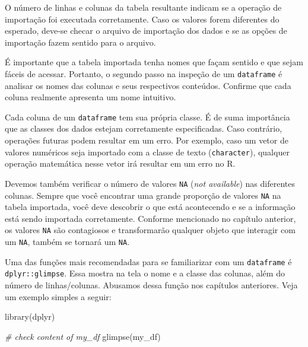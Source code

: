 \documentclass[
  11pt,
]{book}
\newenvironment{Shaded}{\begin{snugshade}}{\end{snugshade}}
\newcommand{\CommentTok}[1]{\textcolor[rgb]{0.37,0.37,0.37}{\textit{#1}}}
\newcommand{\FunctionTok}[1]{\textcolor[rgb]{0,0,0}{#1}}
\newcommand{\NormalTok}[1]{#1}
\providecommand{\tightlist}{%
  \setlength{\itemsep}{0pt}\setlength{\parskip}{0pt}}
\begin{document}
\begin{description}
\tightlist
\item[Número de linhas e colunas]
O número de linhas e colunas da tabela resultante indicam se a operação de importação foi executada corretamente. Caso os valores forem diferentes do esperado, deve-se checar o arquivo de importação dos dados e se as opções de importação fazem sentido para o arquivo.
\item[Nomes das colunas]
É importante que a tabela importada tenha nomes que façam sentido e que sejam fáceis de acessar. Portanto, o segundo passo na inspeção de um \texttt{dataframe} é analisar os nomes das colunas e seus respectivos conteúdos. Confirme que cada coluna realmente apresenta um nome intuitivo.
\item[Classes das colunas]
Cada coluna de um \texttt{dataframe} tem sua própria classe. É de suma importância que as classes dos dados estejam corretamente especificadas. Caso contrário, operações futuras podem resultar em um erro. Por exemplo, caso um vetor de valores numéricos seja importado com a classe de texto (\texttt{character}), qualquer operação matemática nesse vetor irá resultar em um erro no R.
\item[Existência de dados omissos (\texttt{NA})]
Devemos também verificar o número de valores \texttt{NA} (\emph{not available}) nas diferentes colunas. Sempre que você encontrar uma grande proporção de valores \texttt{NA} na tabela importada, você deve descobrir o que está acontecendo e se a informação está sendo importada corretamente. Conforme mencionado no capítulo anterior, os valores \texttt{NA} são contagiosos e transformarão qualquer objeto que interagir com um \texttt{NA}, também se tornará um \texttt{NA}.
\end{description}

Uma das funções mais recomendadas para se familiarizar com um \texttt{dataframe} é \texttt{dplyr::glimpse}. Essa mostra na tela o nome e a classe das colunas, além do número de linhas/colunas. Abusamos dessa função nos capítulos anteriores. Veja um exemplo simples a seguir:

\begin{Shaded}
\begin{Highlighting}[]
\FunctionTok{library}\NormalTok{(dplyr)}

\CommentTok{\# check content of my\_df}
\FunctionTok{glimpse}\NormalTok{(my\_df)}
\end{Highlighting}
\end{Shaded}
\end{document}
